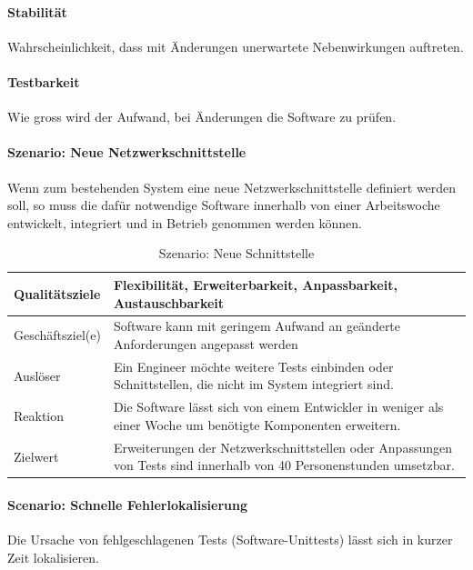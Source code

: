 \documentclass[]{subfiles}
\begin{document}
		\paragraph{Stabilität}
			Wahrscheinlichkeit, dass mit Änderungen unerwartete Nebenwirkungen auftreten.

		\paragraph{Testbarkeit}
			Wie gross wird der Aufwand, bei Änderungen die Software zu prüfen.

		\newpage

		\paragraph{Szenario: Neue Netzwerkschnittstelle}
			Wenn zum bestehenden System eine neue Netzwerkschnittstelle definiert werden soll, so muss die dafür notwendige Software innerhalb von einer Arbeitswoche entwickelt, integriert und in Betrieb genommen werden können.
			
			\begin{table}[!h]
				\begin{tabularx}{\textwidth}{lX}
					\toprule
					Qualitätsziele & Flexibilität, Erweiterbarkeit, Anpassbarkeit, Austauschbarkeit  \\
					\midrule
					Geschäftsziel(e) & Software kann mit geringem Aufwand an geänderte Anforderungen angepasst werden  \\
					\midrule
					Auslöser & Ein Engineer möchte weitere Tests einbinden oder Schnittstellen, die nicht im System integriert sind.  \\
					\midrule
					Reaktion & Die Software lässt sich von einem Entwickler in weniger als einer Woche um benötigte Komponenten erweitern.  \\
					\midrule
					Zielwert & 	Erweiterungen der Netzwerkschnittstellen oder Anpassungen von Tests sind innerhalb von 40 Personenstunden umsetzbar.  \\
					\bottomrule
				\end{tabularx}
				\caption{Szenario: Neue Schnittstelle}
			\end{table}
			

		\paragraph{Scenario: Schnelle Fehlerlokalisierung}
			Die Ursache von fehlgeschlagenen Tests (Software-Unittests) lässt sich in kurzer Zeit lokalisieren.
			
\end{document}
